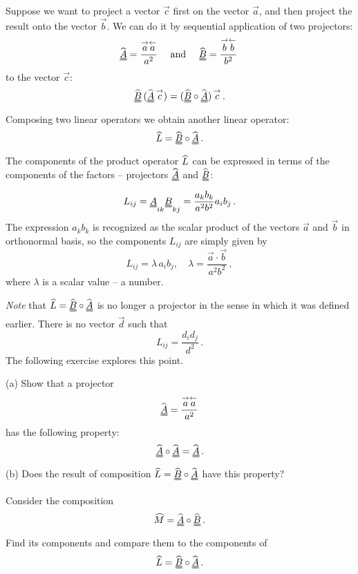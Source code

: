 Suppose we want to project a vector $\vec{c}$ first on the vector
$\vec{a}$, and then project the result onto the vector $\vec{b}$. We
can do it by sequential application of two projectors:
\[
\projop{A} = \frac{\vec{a}\vecl{a}}{a^2}\quad\textrm{ and }\quad \projop{B} =
\frac{\vec{b}\vecl{b}}{b^2}\,
\]
to the vector $\vec{c}$:
\[
\projop{B}\,(\projop{A}\,\vec{c}) = (\projop{B}\circ \projop{A})\,\vec{c}\,.
\]
Composing two linear operators we obtain another linear operator:
\[
\op{L} = \projop{B}\circ \projop{A}\,.
\]
The components of the product operator $\widehat{L}$ can be
expressed in terms of the components of the factors -- projectors
$\projop{A}$ and $\projop{B}$:
\[
L_{ij} = \proj{A}_{ik}\proj{B}_{kj} = \frac{a_kb_k}{a^2b^2}a_ib_j\,.
\]
The expression $a_kb_k$ is recognized as the scalar product of the
vectors $\vec{a}$ and $\vec{b}$ in orthonormal basis, so the
components $L_{ij}$ are simply given by
\[
L_{ij} = \lambda\, a_ib_j,\quad \lambda = \frac{\vec{a}\cdot\vec{b}}{a^2b^2}\,,
\]
where $\lambda$ is a scalar value -- a number.

\emph{Note} that $\op{L}=\projop{B}\circ \projop{A}$ is no longer a projector in the
sense in which it was defined earlier. There is no vector $\vec{d}$ such that
\[
L_{ij} = \frac{d_i d_j}{d^2}\,.
\]
The following exercise explores this point.
\begin{exercise}\label{exe:projectorIdempotent}
  (a) Show that a projector
  \[
  \projop{A} = \frac{\vec{a}\vecl{a}}{a^2}
  \]
  has the following property:
  \[
  \projop{A}\circ \projop{A} = \projop{A}\,.
  \]
  (b) Does the result of composition $\op{L}=\projop{B}\circ \projop{A}$ have
  this property?
\end{exercise}

\begin{exercise}\label{exe:projectorsCommutativity}
  Consider the composition
  \[
  \op{M} = \projop{A}\circ \projop{B}\,.
  \]
  Find its components and compare them to the components of
  \[
  \op{L}=\projop{B}\circ \projop{A}\,.
  \]
\end{exercise}

